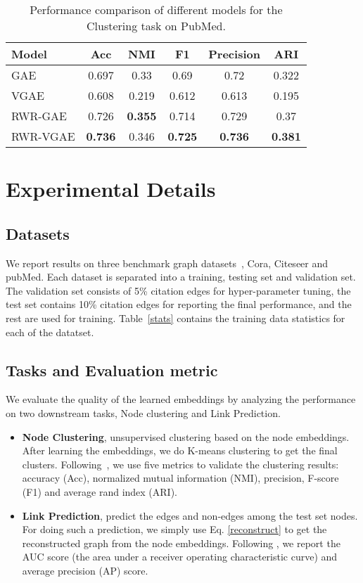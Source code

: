 \documentclass{article}
\begin{document}
\begin{table}[h]
\begin{center}
\begin{tabular}{lccccc}
\toprule
\bf Model & \bf Acc & \bf NMI & \bf F1 & \bf Precision & \bf ARI \\
\midrule
GAE & 0.697&	0.33	&0.69&	0.72&	0.322\\
VGAE & 0.608	&0.219	&0.612	&0.613	&0.195\\
\midrule
RWR-GAE & 0.726	&\bf 0.355	&0.714	&0.729	&0.37\\
RWR-VGAE &\bf 0.736	&0.346	&\bf 0.725	&\bf 0.736	&\bf 0.381\\
\bottomrule
\end{tabular}
\end{center}
\caption{Performance comparison of different models for the Clustering task on PubMed.}
\label{results:nc:pubmed}
\end{table}

\section{Experimental Details}
\subsection{Datasets}
We report results on three benchmark graph datasets~\cite{sen2008collective}, Cora, Citeseer and pubMed. Each dataset is separated into a training, testing set and validation set. The validation set consists of 5\% citation edges for hyper-parameter tuning, the test set contains 10\% citation edges for reporting the final performance, and the rest are used for training. Table~\ref{stats} contains the training data statistics for each of the datatset.



\subsection{Tasks and Evaluation metric}
We evaluate the quality of the learned embeddings by analyzing the performance on two downstream tasks, Node clustering and Link Prediction.
\begin{itemize}
    \item \textbf{Node Clustering}, unsupervised clustering based on the node embeddings. After learning the embeddings, we do K-means clustering to get the final clusters. Following~\cite{xia2014robust}, we use five metrics to validate the clustering results: accuracy (Acc), normalized mutual information (NMI), precision, F-score (F1) and average rand index (ARI).
    \item \textbf{Link Prediction}, predict the edges and non-edges among the test set nodes. For doing such a prediction, we simply use Eq. \ref{reconstruct} to get the reconstructed graph from the node embeddings. Following \cite{vgae}, we report the AUC score (the area under a receiver operating characteristic curve) and average precision (AP) score. 
\end{itemize}
\end{document}
